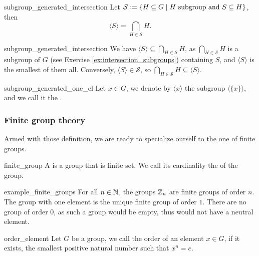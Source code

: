 \begin{cprop}{}{subgroup_generated_intersection}
    Let \( \mathcal S := \{ H \subseteq G \mid H \text{ subgroup and } S \subseteq H\} \), then
    \begin{equation*}
        \langle S \rangle = \bigcap_{H \in \mathcal S} H.
    \end{equation*}
\end{cprop}
\begin{propproof}{subgroup_generated_intersection}
    We have \( \langle S \rangle \subseteq \bigcap_{H \in \mathcal S} H \), as \( \bigcap_{H \in \mathcal S} H \) is a subgroup of \( G \) (see Exercise \ref{ex:intersection_subgroups}) containing \( S \), and \( \langle S \rangle \) is the smallest of them all. Conversely, \( \langle S \rangle \in \mathcal{S} \), so \( \bigcap_{H \in \mathcal S} H \subseteq \langle S \rangle \). 
\end{propproof}

\begin{cdef}{}{subgroup_generated_one_el}
    Let \( x \in G \), we denote by \( \langle x \rangle \) the subgroup \( \langle \{ x \} \rangle \), and we call it the .    
\end{cdef}

\subsubsection{Finite group theory}

Armed with those definition, we are ready to specialize ourself to the one of finite groups. 
\begin{cdef}{}{finite_group}
    A  is a group that is finite set. We call its cardinality the  of the group.
\end{cdef}

\begin{cex}{}{example_finite_groups}
    For all \( n \in \mathbb{N} \), the groups \( \mathbb{Z}_n \) are finite groups of order \( n \). The group with one element is the unique finite group of order \( 1 \). There are no group of order \( 0 \), as such a group would be empty, thus would not have a neutral element. 
\end{cex}

\begin{cdef}{}{order_element}
    Let \( G \) be a group, we call the order of an element \( x \in G \), if it exists, the smallest positive natural number such that \( x^n = e \). 
\end{cdef}

